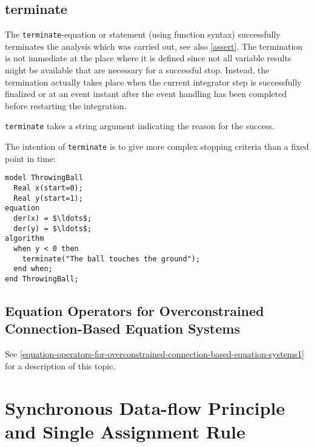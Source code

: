 \subsection{terminate}\label{terminate}

The \lstinline!terminate!-equation or statement (using function syntax) successfully terminates the analysis which was carried out, see also \cref{assert}.
The termination is not immediate at the place where it is defined since not all variable results might be available that are necessary for a successful stop.
Instead, the termination actually takes place when the current integrator step is successfully finalized or at an event instant after the event handling has been completed before restarting the integration.

\lstinline!terminate! takes a string argument indicating the reason for the success.

\begin{example}
The intention of \lstinline!terminate! is to give more complex stopping criteria than a fixed point in time:
\begin{lstlisting}[language=modelica]
model ThrowingBall
  Real x(start=0);
  Real y(start=1);
equation
  der(x) = $\ldots$;
  der(y) = $\ldots$;
algorithm
  when y < 0 then
    terminate("The ball touches the ground");
  end when;
end ThrowingBall;
\end{lstlisting}
\end{example}

\subsection{Equation Operators for Overconstrained Connection-Based Equation Systems}\label{equation-operators-for-overconstrained-connection-based-equation-systems}

See \cref{equation-operators-for-overconstrained-connection-based-equation-systems1} for a description of this topic.

\section{Synchronous Data-flow Principle and Single Assignment Rule}\label{synchronous-data-flow-principle-and-single-assignment-rule}

